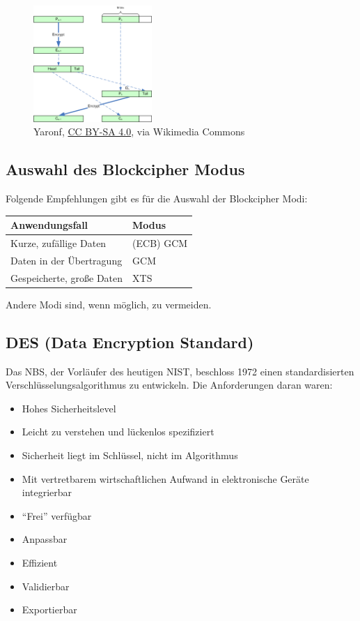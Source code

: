 \begin{figure}[h]
    \includegraphics[width=0.4\textwidth]{figures/fig03-CTS_ECB_Encryption}
    \centering
    \caption{Yaronf, \href{https://creativecommons.org/licenses/by-sa/4.0}{CC BY-SA 4.0}, via Wikimedia Commons}
\end{figure}

\subsection{Auswahl des Blockcipher Modus}

Folgende Empfehlungen gibt es für die Auswahl der Blockcipher Modi:

\begin{center}
    \begin{tabular}{ ll } 
        \hline
        Anwendungsfall & Modus \\ 
        \hline
        Kurze, zufällige Daten & (ECB) GCM \\
        Daten in der Übertragung & GCM \\
        Gespeicherte, große Daten & XTS \\
        \hline
    \end{tabular}
\end{center}

Andere Modi sind, wenn möglich, zu vermeiden.

\subsection{DES (Data Encryption Standard)}

Das NBS, der Vorläufer des heutigen NIST, beschloss 1972 einen standardisierten Verschlüsselungsalgorithmus zu entwickeln. Die Anforderungen daran waren:

\begin{itemize}
    \item Hohes Sicherheitslevel
    \item Leicht zu verstehen und lückenlos spezifiziert
    \item Sicherheit liegt im Schlüssel, nicht im Algorithmus
    \item Mit vertretbarem wirtschaftlichen Aufwand in elektronische Geräte integrierbar
    \item ``Frei'' verfügbar
    \item Anpassbar
    \item Effizient
    \item Validierbar
    \item Exportierbar
\end{itemize}

